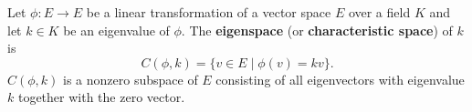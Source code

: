 Let $\phi : E \to E$ be a linear transformation of a vector space $E$ over a field $K$ and let $k \in K$ be an eigenvalue of $\phi$. The \textbf{eigenspace} (or \textbf{characteristic space}) of $k$ is
\[
C(\phi, k) = \{ v \in E \mid \phi(v) = kv \}.
\]
$C(\phi, k)$ is a nonzero subspace of $E$ consisting of all eigenvectors with eigenvalue $k$ together with the zero vector.
